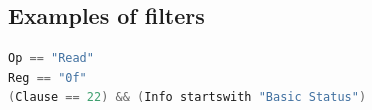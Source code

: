 \subsection{Examples of filters}

\begin{lstlisting}[language=C]
Op == "Read"
Reg == "0f"
(Clause == 22) && (Info startswith "Basic Status")
\end{lstlisting}
